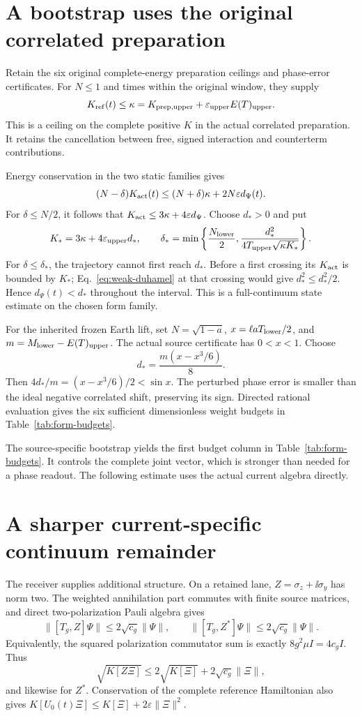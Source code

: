 \section{A bootstrap uses the original correlated preparation}
Retain the six original complete-energy preparation ceilings and phase-error certificates. For $N\le1$ and times within the original window, they supply
\[
 K_{\rm ref}(t)\le\kappa
 =K_{{\rm prep},\mathrm{upper}}+\varepsilon_{\rm upper}E(T)_{\rm upper}.
\]
This is a ceiling on the complete positive $K$ in the actual correlated preparation. It retains the cancellation between free, signed interaction and counterterm contributions.

Energy conservation in the two static families gives
\[
 (N-\delta)K_{\rm act}(t)
 \le(N+\delta)\kappa+2N\varepsilon d_\Psi(t).
\]
For $\delta\le N/2$, it follows that $K_{\rm act}\le3\kappa+4\varepsilon d_\Psi$. Choose $d_*>0$ and put
\[
 K_*=3\kappa+4\varepsilon_{\rm upper}d_*,\qquad
 \delta_*=\min\left\{\frac{N_{\rm lower}}2,
 \frac{d_*^2}{4T_{\rm upper}\sqrt{\kappa K_*}}\right\}.
\]
For $\delta\le\delta_*$, the trajectory cannot first reach $d_*$. Before a first crossing its $K_{\rm act}$ is bounded by $K_*$; Eq.~\eqref{eq:weak-duhamel} at that crossing would give $d_*^2\le d_*^2/2$. Hence $d_\Psi(t)<d_*$ throughout the interval. This is a full-continuum state estimate on the chosen form family.

For the inherited frozen Earth lift, set $N=\sqrt{1-a}$, $x=\ell aT_{\rm lower}/2$, and $m=M_{\rm lower}-E(T)_{\rm upper}$. The actual source certificate has $0<x<1$. Choose
\[
 d_*=\frac{m(x-x^3/6)}8.
\]
Then $4d_*/m=(x-x^3/6)/2<\sin x$. The perturbed phase error is smaller than the ideal negative correlated shift, preserving its sign. Directed rational evaluation gives the six sufficient dimensionless weight budgets in Table~\ref{tab:form-budgets}.

The source-specific bootstrap yields the first budget column in Table~\ref{tab:form-budgets}. It controls the complete joint vector, which is stronger than needed for a phase readout. The following estimate uses the actual current algebra directly.

\section{A sharper current-specific continuum remainder}
The receiver supplies additional structure. On a retained lane, $Z=\sigma_z+\ii\sigma_y$ has norm two. The weighted annihilation part commutes with finite source matrices, and direct two-polarization Pauli algebra gives
\[
 \|[T_g,Z]\Psi\|\le2\sqrt{c_g}\|\Psi\|,\qquad
 \|[T_g,Z^*]\Psi\|\le2\sqrt{c_g}\|\Psi\|.
\]
Equivalently, the squared polarization commutator sum is exactly $8g^2\mu I=4c_gI$. Thus
\[
 \sqrt{K[Z\Xi]}\le2\sqrt{K[\Xi]}+2\sqrt{c_g}\|\Xi\|,
\]
and likewise for $Z^*$. Conservation of the complete reference Hamiltonian also gives $K[U_0(t)\Xi]\le K[\Xi]+2\varepsilon\|\Xi\|^2$.

